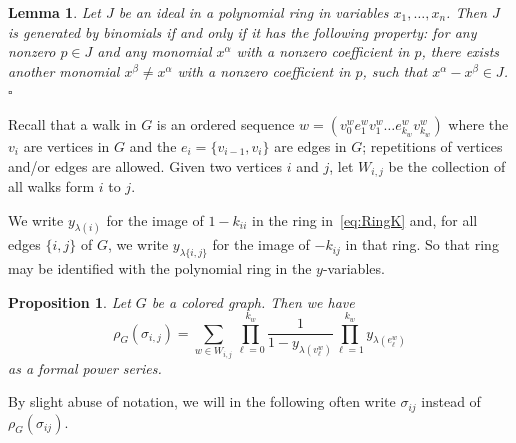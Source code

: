 \documentclass[a4paper, 11pt]{amsart}
\numberwithin{theorem}{section}
\newtheorem{lemma}[theorem]{Lemma}
\newtheorem{proposition}[theorem]{Proposition}
\begin{document}
\begin{lemma}
Let $J$ be an ideal in a polynomial ring in variables
$x_1,\ldots,x_n$. Then $J$ is generated by binomials if and only if it
has the following property: for any nonzero $p \in J$ and any monomial
$x^\alpha$ with a nonzero coefficient in $p$, there exists another
monomial $x^\beta \neq x^\alpha$ with a nonzero coefficient in $p$,
such that $x^\alpha - x^\beta \in J$. \hfill $\square$
\end{lemma}

Recall that a walk in $G$ is an ordered sequence $w =
(v_0^we_1^wv_1^w\dots e_{k_w}^wv_{k_w}^w)$ where the $v_i$ are vertices
in $G$ and the $e_i=\{v_{i-1},v_i\}$ are edges in $G$; repetitions of
vertices and/or edges are allowed. Given two vertices $i$ and $j$,
let $W_{i,j}$ be the collection of all walks form $i$ to $j$.

We write $y_{\lambda(i)}$ for the image of $1-k_{ii}$ in the ring
in~\eqref{eq:RingK} and, for all edges $\{i,j\}$ of $G$, we write
$y_{\lambda\{i,j\}}$ for the image of $-k_{ij}$ in that ring. So that
ring may be identified with the polynomial ring in the $y$-variables.

\begin{proposition} \label{prop:Sigmaij}
    Let $G$ be a colored graph. Then we have 
\begin{equation}\label{eq:sigma-i-j}
    \rho_G(\sigma_{i,j}) = \sum_{w\in
    W_{i,j}}\prod_{\ell=0}^{k_w}\frac{1}{1-y_{\lambda(v_\ell^w)}}\prod_{\ell=1}^{k_w}
    y_{\lambda(e_\ell^w)}
\end{equation}
as a formal power series. 
\end{proposition}

By slight abuse of notation, we will in the following often write
$\sigma_{ij}$ instead of $\rho_G(\sigma_{ij})$.
\end{document}
